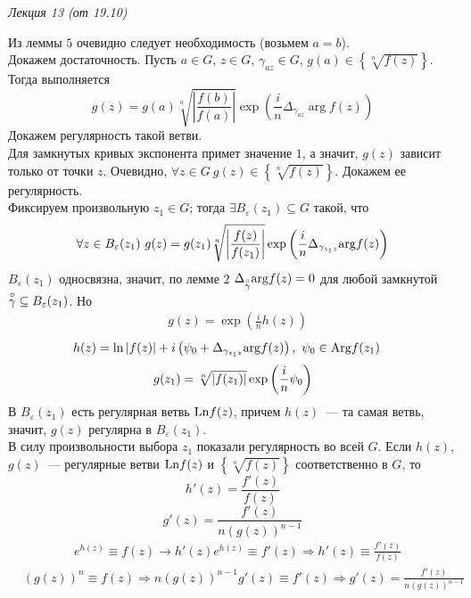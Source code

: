\begin{flushright}
    \textit{Лекция 13 (от 19.10)}
\end{flushright}
\pr
Из леммы $5$ очевидно следует необходимость (возьмем $a = b$).
\\
Докажем достаточность. Пусть $a \in G$, $z \in G$, $\gamma_{az}\in G$, $g(a) \in
\left\{ \sqrt[n]{f(z)} \right\}$. Тогда выполняется
\begin{equation}\label{(16.16)}
    g(z) = g(a) \sqrt[n]{\left| \frac{f(b)}{f(a)} \right|}\exp \left( \frac{i}{n} \Delta_{\gamma_{az}}\arg f(z) \right)
\end{equation}
Докажем регулярность такой ветви.
\\
Для замкнутых кривых экспонента примет значение $1$, а значит, $g(z)$ зависит
только от точки $z$. Очевидно, $\forall z \in G \ g(z)\in \left\{ \sqrt[n]{f(z)}
\right\}$. Докажем ее регулярность.
\\
Фиксируем произвольную $z_1 \in G$; тогда $\exists B_\varepsilon(z_1) \subseteq G$
такой, что
\begin{equation}\label{(16.17)}
    \forall z \in B_\varepsilon(z_1) \ g(z) = g(z_1) \sqrt[n]{\left| \frac{f(z)}{f(z_1)} \right|}\exp \left( \frac{i}{n} \Delta_{\gamma_{z_1z}}\mathrm{arg} f(z) \right)
\end{equation}
$B_{\varepsilon}(z_1)$ односвязна, значит, по лемме $2$
$\Delta_{\overset{\circ}{\gamma}}\mathrm{arg} f(z) = 0$ для любой замкнутой
$\overset{\circ}{\gamma} \subseteq B_\varepsilon(z_1)$. Но
\begin{align*}
  & g(z) = \exp \left( \frac{i}{n} h(z) \right)
\end{align*}
\begin{align*}
  & h(z) = \ln \left| f(z) \right| + i \left(\psi_0 + \Delta_{\gamma_{z_1z}}\mathrm{arg} f(z)\right), \ \psi_0 \in \mathrm{Arg} f(z_1)
\end{align*}
\begin{equation}\label{(16.18)}
    g(z_1) = \sqrt[n]{\left|{f(z_1)}\right|} \exp\left( \frac{i}{n}\psi_0 \right)
\end{equation}
В $B_\varepsilon(z_1)$ есть регулярная ветвь $\mathrm{Ln} f(z)$, причем $h(z)$~--- та
самая ветвь, значит, $g(z)$ регулярна в $B_\varepsilon(z_1)$.
\\
В силу произвольности выбора $z_1$ показали регулярность во всей $G$.
\corollary
Если $h(z)$, $g(z)$~--- регулярные ветви $\mathrm{Ln} f(z)$ и $\left\{ \sqrt[n]{f(z)}
\right\}$ соответственно в $G$, то
\begin{equation}\label{(16.19)}
    h'(z) = \frac{f'(z)}{f(z)}
\end{equation}
\begin{equation}\label{(16.20)}
    g'(z) = \frac{f'(z)}{n\left( g(z) \right)^{n-1}}
\end{equation}
\pr
\begin{align*}
  & e^{h(z)} \equiv f(z) \rightarrow h'(z)e^{h(z)} \equiv f'(z) \Rightarrow h'(z) \equiv \frac{f'(z)}{f(z)}
\end{align*}
\begin{align*}
  & (g(z))^n \equiv f(z) \Rightarrow n(g(z))^{n-1}g'(z) \equiv f'(z) \Rightarrow g'(z) = \frac{f'(z)}{n\left( g(z) \right)^{n-1}}
\end{align*}
